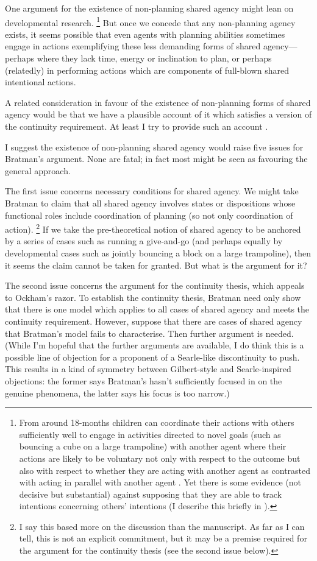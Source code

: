 \documentclass[12pt,letterpaper]{extarticle}
\begin{document}
One argument for the existence of non-planning shared agency might lean on developmental research.%
%
\footnote{
From around 18-months children can coordinate their actions with others sufficiently well to  engage in activities directed to novel goals (such as bouncing a cube on a large trampoline) with another agent \citep{Warneken:2006qe} where their actions are likely to be voluntary not only with respect to the outcome but also with respect to whether they are acting with another agent as contrasted with acting in parallel with another agent \citep{Grafenhain:2010zl}.
Yet there is some evidence (not decisive but substantial) against supposing that they are able to track intentions concerning others' intentions (I describe this briefly in \citet{Butterfill:2011fk}).
} 
%
But once we concede that any non-planning agency exists, it seems possible that even agents with planning abilities  sometimes engage in actions exemplifying these less demanding forms of shared agency---perhaps where they lack time, energy or inclination to plan, or perhaps (relatedly) in performing actions which are components of full-blown shared intentional actions.

A related consideration in favour of the existence of non-planning forms of shared agency would be that we have a plausible account of it which satisfies a version of the continuity requirement.
At least I try to provide such an account \citep{Butterfill:2011fk,Butterfill:2011_wija}.

I suggest the existence of non-planning shared agency would raise five issues for Bratman's argument.  None are fatal; in fact most might be seen as favouring the general approach.

The first issue concerns necessary conditions for shared agency. 
We might take Bratman to claim that all shared agency involves states or dispositions whose functional roles include coordination of planning (so not only coordination of action).%
\footnote{
I say this based more on the discussion than the manuscript.
As far as I can tell, this is not an explicit commitment, but it may be a premise required for the argument for the continuity thesis (see the second issue below).
}
If we take the pre-theoretical notion of shared agency to be anchored by a series of cases such as running a give-and-go (and perhaps equally by developmental cases such as jointly bouncing a block on a large trampoline), then it seems the claim cannot be taken for granted.
But what is the argument for it?

The second issue concerns the argument for the continuity thesis, which appeals to Ockham's razor.
To establish the continuity thesis, Bratman need only show that there is one model which applies to all cases of shared agency and meets the continuity requirement.
However, suppose that there are cases of shared agency that Bratman's model fails to characterise.
Then further argument is needed. 
(While I'm hopeful that the further arguments are available, I do think this is a possible line of objection for a proponent of a Searle-like discontinuity to push.
This results in a kind of symmetry between Gilbert-style and Searle-inspired objections: the former says Bratman's hasn't sufficiently focused in on the genuine phenomena, the latter says his focus is too narrow.)
\end{document}
